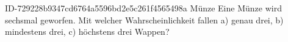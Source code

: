 \begin{exercise}
      {ID-729228b9347cd6764a5596bd2e5c261f4565498a}
      {Münze}
  \ifproblem\problem
    Eine Münze wird sechsmal geworfen. Mit welcher Wahrscheinlichkeit fallen
    a) genau drei,
    b) mindestens drei,
    c) höchstens drei
    Wappen?
  \fi
\end{exercise}

